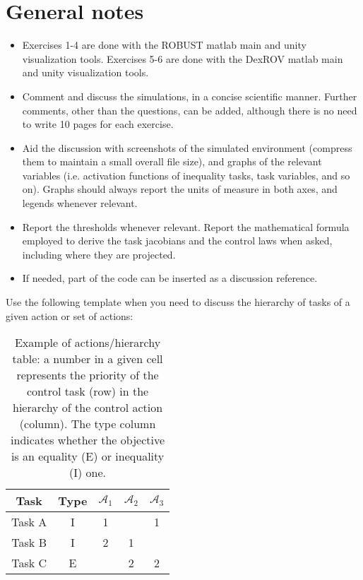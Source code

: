 \section{General notes} 
\begin{itemize}
	\item Exercises 1-4 are done with the ROBUST matlab main and unity visualization
		tools. Exercises 5-6 are done with the DexROV matlab main and unity
		visualization tools.
	\item Comment and discuss the simulations, in a concise scientific manner. Further
		comments, other than the questions, can be added, although there is no need to
		write 10 pages for each exercise.
	\item Aid the discussion with screenshots of the simulated environment (compress
		them to maintain a small overall file size), and graphs of the relevant
		variables (i.e. activation functions of inequality tasks, task variables, and so
		on). Graphs should always report the units of measure in both axes, and legends
		whenever relevant.
	\item Report the thresholds whenever relevant.  Report the mathematical formula
		employed to derive the task jacobians and the control laws when asked, including
		where they are projected.
	\item If needed, part of the code can be inserted as a discussion reference.
\end{itemize}

Use the following template when you need to discuss the hierarchy of tasks of a
given action or set of actions:
\begin{table}[htb]
	\caption{
		Example of actions/hierarchy table: a number in a given cell
		represents the priority of the control task (row) in the
		hierarchy of the control action (column). The type column
		indicates whether the objective is an equality (E) or inequality
		(I) one.
	}
	\label{table:actions_table}
	\begin{center}
		\footnotesize
		\begin{tabular}{ccccc}
			\toprule
			Task & Type & $\mathcal{A}_{1}$ & $\mathcal{A}_{2}$ &
			$\mathcal{A}_{3}$\\
			\midrule
			Task A & I & 1 & & 1   \\
			\hdashline
			Task B & I & 2 & 1 &   \\
			\hdashline
			Task C & E &   & 2 & 2 \\
			\bottomrule
		\end{tabular}
	\end{center}
\end{table}%
